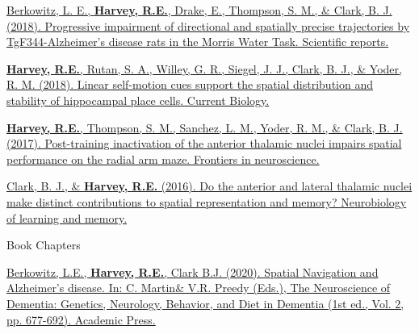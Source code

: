 \begin{cventries}
{\begin{cvitems}
            \item {\href{https://doi.org/10.1038/s41598-018-34368-w}{Berkowitz, L. E., \textbf{Harvey, R.E.}, Drake, E., Thompson, S. M., \& Clark, B. J. (2018). Progressive impairment of directional and spatially precise trajectories by TgF344-Alzheimer’s disease rats in the Morris Water Task. Scientific reports.}} 
            \item {\href{https://doi.org/10.1016/j.cub.2018.04.034}{\textbf{Harvey, R.E.}, Rutan, S. A., Willey, G. R., Siegel, J. J., Clark, B. J., \& Yoder, R. M. (2018). Linear self-motion cues support the spatial distribution and stability of hippocampal place cells. Current Biology.}}
            \item {\href{https://doi.org/10.3389/fnins.2017.00094}{\textbf{Harvey, R.E.}, Thompson, S. M., Sanchez, L. M., Yoder, R. M., \& Clark, B. J. (2017). Post-training inactivation of the anterior thalamic nuclei impairs spatial performance on the radial arm maze. Frontiers in neuroscience.}} 
            \item {\href{https://doi.org/10.1016/j.nlm.2016.06.002}{Clark, B. J., \& \textbf{Harvey, R.E.} (2016). Do the anterior and lateral thalamic nuclei make distinct contributions to spatial representation and memory? Neurobiology of learning and memory.}}
      \end{cvitems}
    }
    
\cventry
    {Book Chapters} %
    {} %
    {} %
    {} %
    {
      \begin{cvitems} %
      \setlength\itemsep{0.5em}
          \item {\href{https://doi.org/10.1016/B978-0-12-815868-5.00043-8}{Berkowitz, L.E., \textbf{Harvey, R.E.}, Clark B.J. (2020). Spatial Navigation and Alzheimer’s disease. In: C. Martin\& V.R. Preedy (Eds.), The Neuroscience of Dementia: Genetics, Neurology, Behavior, and Diet in Dementia (1st ed., Vol. 2, pp. 677-692). Academic Press.}}
      \end{cvitems}
    }
\end{cventries}